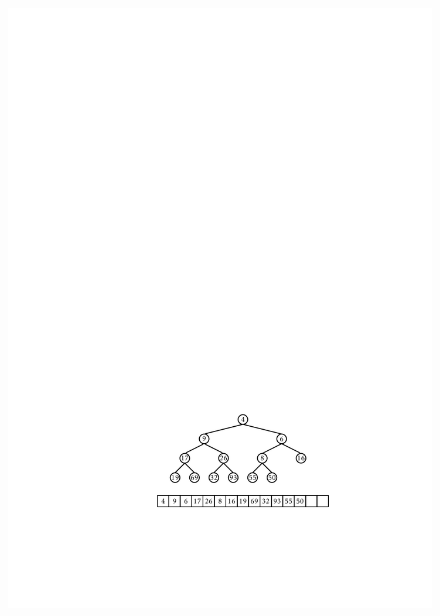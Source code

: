 \begin{figure}
  \begin{center}
    \includegraphics[height=\QuarterHeightScaleIfNeeded]{figs/heap-remove-1} \\

\end{center}
\end{figure}
